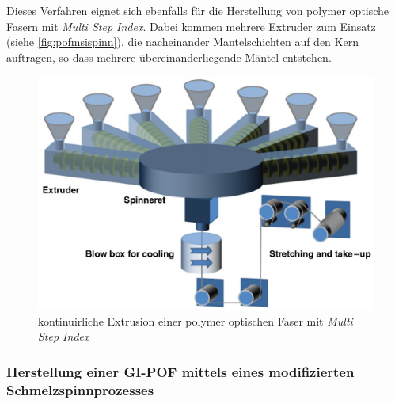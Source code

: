 Dieses Verfahren eignet sich ebenfalls für die Herstellung von polymer optische
Fasern mit \textit{Multi Step Index}. Dabei kommen mehrere Extruder zum Einsatz
(siehe \autoref{fig:pofmsispinn}), die nacheinander Mantelschichten auf den Kern
auftragen, so dass mehrere übereinanderliegende Mäntel entstehen.
\cite{pofspinn}

\begin{figure}[h]
    \begin{center}
        \begin{minipage}[t]{\textwidth}
            \begin{center}
                \includegraphics[height=0.25\textheight]{Bilder/Optische_Wellenleiter_Die_Polymer_Optische_Faser/Herstellung/pofmsispinn.png}
                \caption[kontinuirliche Extrusion einer polymer optischen Faser mit \textit{Multi Step Index} \newline \url{http://www.researchgate.net/publication/265646639_An_overview_on_fabrication_methods_for_polymer_optical_fibers} S. 5 (zuletzt aufgerufen am 28.09.2015)]{kontinuirliche Extrusion einer polymer optischen Faser mit \textit{Multi Step Index}}
                \label{fig:pofmsispinn}
            \end{center}
        \end{minipage}
    \end{center}
\end{figure}

\subsubsection{Herstellung einer GI-POF mittels eines modifizierten Schmelzspinnprozesses}

